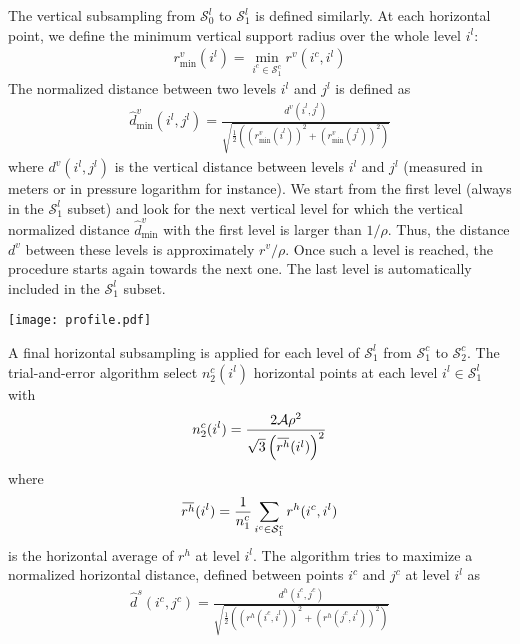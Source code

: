 \documentclass[12pt]{scrartcl}
\newcommand{\overbar}[1]{\mkern 1.5mu\overline{\mkern-1.5mu#1\mkern-1.5mu}\mkern 1.5mu}
\begin{document}
The vertical subsampling from $\mathcal{S}^l_0$ to $\mathcal{S}^l_1$ is defined similarly. At each horizontal point, we define the minimum vertical support radius over the whole level $i^l$:
\begin{align}
r^v_\mathrm{min}(i^l) = \min_{i^c \in \mathcal{S}^c_1} r^v(i^c,i^l)
\end{align}
The normalized distance between two levels $i^l$ and $j^l$ is defined as
\begin{align}
\widehat{d}^v_\text{min}(i^l,j^l) = \frac{d^v(i^l,j^l)}{\displaystyle \sqrt{\frac{1}{2}\left(\left(r^v_\mathrm{min}(i^l)\right)^2+\left(r^v_\mathrm{min}(j^l)\right)^2\right)}}
\end{align}
where $d^v(i^l,j^l)$ is the vertical distance between levels $i^l$ and $j^l$ (measured in meters or in pressure logarithm for instance). We start from the first level (always in the $\mathcal{S}^l_1$ subset) and look for the next vertical level for which the vertical normalized distance $\widehat{d}^v_\text{min}$ with the first level is larger than $1/\rho$. Thus, the distance $d^v$ between these levels is approximately $r^v/\rho$. Once such a level is reached, the procedure starts again towards the next one. The last level is automatically included in the $\mathcal{S}^l_1$ subset.
 
\begin{center}
\texttt{[image: profile.pdf]}
\end{center}

A final horizontal subsampling is applied for each level of $\mathcal{S}^l_1$ from $\mathcal{S}^c_1$ to $\mathcal{S}^c_2$. The trial-and-error algorithm select $n^c_2(i^l)$ horizontal points at each level $i^l \in \mathcal{S}^l_1$ with
\begin{align}
n^c_2(i^l) = \frac{2 \mathcal{A} \rho^2}{\sqrt{3} \left(\overbar{r^h}(i^l)\right)^2}
\end{align}
where
\begin{align}
\overbar{r^h}(i^l) = \frac{1}{n^c_1} \sum_{i^c \in \mathcal{S}^c_1} r^h(i^c,i^l)
\end{align}
is the horizontal average of $r^h$ at level $i^l$. The algorithm tries to maximize a normalized horizontal distance, defined between points $i^c$ and $j^c$ at level $i^l$ as
\begin{align}
\widehat{d}^s(i^c,j^c) = \frac{d^h(i^c,j^c)}{\displaystyle \sqrt{\frac{1}{2}\left(\left(r^h(i^c,i^l)\right)^2+\left(r^h(j^c,i^l)\right)^2\right)}}
\end{align}
\end{document}

